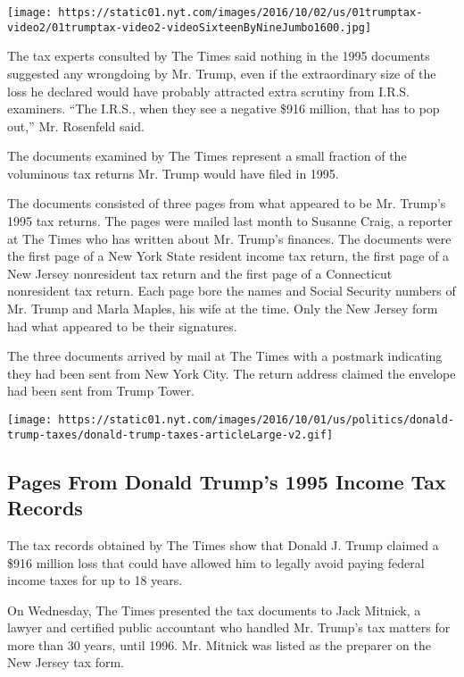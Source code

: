 \texttt{[image: https://static01.nyt.com/images/2016/10/02/us/01trumptax-video2/01trumptax-video2-videoSixteenByNineJumbo1600.jpg]}

The tax experts consulted by The Times said nothing in the 1995
documents suggested any wrongdoing by Mr. Trump, even if the
extraordinary size of the loss he declared would have probably attracted
extra scrutiny from I.R.S. examiners. ``The I.R.S., when they see a
negative \$916 million, that has to pop out,'' Mr. Rosenfeld said.

The documents examined by The Times represent a small fraction of the
voluminous tax returns Mr. Trump would have filed in 1995.

The documents consisted of three pages from what appeared to be Mr.
Trump's 1995 tax returns. The pages were mailed last month to Susanne
Craig, a reporter at The Times who has written about Mr. Trump's
finances. The documents were the first page of a New York State resident
income tax return, the first page of a New Jersey nonresident tax return
and the first page of a Connecticut nonresident tax return. Each page
bore the names and Social Security numbers of Mr. Trump and Marla
Maples, his wife at the time. Only the New Jersey form had what appeared
to be their signatures.

The three documents arrived by mail at The Times with a postmark
indicating they had been sent from New York City. The return address
claimed the envelope had been sent from Trump Tower.

\href{https://www.nytimes.com/interactive/2016/10/01/us/politics/donald-trump-taxes.html}{}

\texttt{[image: https://static01.nyt.com/images/2016/10/01/us/politics/donald-trump-taxes/donald-trump-taxes-articleLarge-v2.gif]}

\hypertarget{pages-from-donald-trumps-1995-income-tax-records}{%
\subsection{Pages From Donald Trump's 1995 Income Tax
Records}\label{pages-from-donald-trumps-1995-income-tax-records}}

The tax records obtained by The Times show that Donald J. Trump claimed
a \$916 million loss that could have allowed him to legally avoid paying
federal income taxes for up to 18 years.

On Wednesday, The Times presented the tax documents to Jack Mitnick, a
lawyer and certified public accountant who handled Mr. Trump's tax
matters for more than 30 years, until 1996. Mr. Mitnick was listed as
the preparer on the New Jersey tax form.

